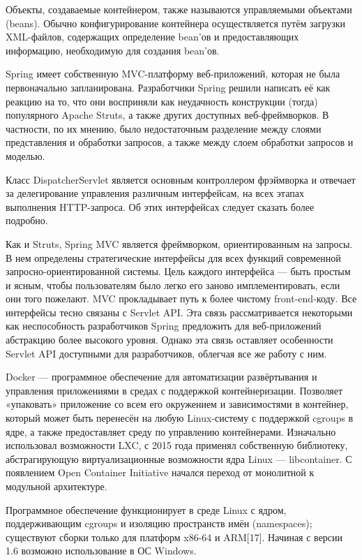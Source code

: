 Объекты, создаваемые контейнером, также называются управляемыми объектами (beans). Обычно конфигурирование контейнера осуществляется путём загрузки XML-файлов, содержащих определение bean’ов и предоставляющих информацию, необходимую для создания bean’ов.

Spring имеет собственную MVC-платформу веб-приложений, которая не была первоначально запланирована. Разработчики Spring решили написать её как реакцию на то, что они восприняли как неудачность конструкции (тогда) популярного Apache Struts, а также других доступных веб-фреймворков. В частности, по их мнению, было недостаточным разделение между слоями представления и обработки запросов, а также между слоем обработки запросов и моделью.

Класс DispatcherServlet является основным контроллером фрэймворка и отвечает за делегирование управления различным интерфейсам, на всех этапах выполнения HTTP-запроса. Об этих интерфейсах следует сказать более подробно.

Как и Struts, Spring MVC является фреймворком, ориентированным на запросы. В нем определены стратегические интерфейсы для всех функций современной запросно-ориентированной системы. Цель каждого интерфейса — быть простым и ясным, чтобы пользователям было легко его заново имплементировать, если они того пожелают. MVC прокладывает путь к более чистому front-end-коду. Все интерфейсы тесно связаны с Servlet API. Эта связь рассматривается некоторыми как неспособность разработчиков Spring предложить для веб-приложений абстракцию более высокого уровня. Однако эта связь оставляет особенности Servlet API доступными для разработчиков, облегчая все же работу с ним. 

Docker — программное обеспечение для автоматизации развёртывания и управления приложениями в средах с поддержкой контейнеризации. Позволяет «упаковать» приложение со всем его окружением и зависимостями в контейнер, который может быть перенесён на любую Linux-систему с поддержкой cgroups в ядре, а также предоставляет среду по управлению контейнерами. Изначально использовал возможности LXC, с 2015 года применял собственную библиотеку, абстрагирующую виртуализационные возможности ядра Linux — libcontainer. С появлением ​Open Container Initiative начался переход от монолитной к модульной архитектуре.

Программное обеспечение функционирует в среде Linux с ядром, поддерживающим cgroups и изоляцию пространств имён (namespaces); существуют сборки только для платформ x86-64 и ARM[17]. Начиная с версии 1.6 возможно использование в ОС Windows.

